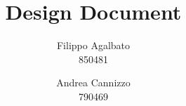 \documentclass[a4paper]{report}
\begin{document}
\setcounter{tocdepth}{1}

\title{\Huge Design Document}
\author{Filippo Agalbato \\ 850481 \and Andrea Cannizzo \\ 790469}
\maketitle

\tableofcontents






\appendix

\end{document}
